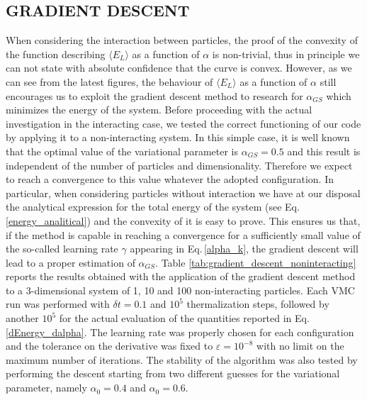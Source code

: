 \subsection{GRADIENT DESCENT}
\label{sec:gradient_descent_results}
When considering the interaction between particles, the proof of the convexity of the function describing $\langle E_L \rangle$ as a function of $\alpha$ is non-trivial, thus in principle we can not state with absolute confidence that the curve is convex. However, as we can see from the latest figures, the behaviour of $\langle E_L \rangle$ as a function of $\alpha$ still encourages us to exploit the gradient descent method to research for  $\alpha_{GS}$ which minimizes the energy of the system. Before proceeding with the actual investigation in the interacting case, we tested the correct functioning of our code by applying it to a non-interacting system. In this simple case, it is well known that the optimal value of the variational parameter is $\alpha_{GS}=0.5$ and this result is independent of the number of particles and dimensionality. Therefore we expect to reach a convergence to this value whatever the adopted configuration. In particular, when considering particles without interaction we have at our disposal the analytical expression for the total energy of the system (see Eq.\,\ref{energy_analitical}) and the convexity of it is easy to prove. This ensures us that, if the method is capable in reaching a convergence for a sufficiently small value of the so-called learning rate $\gamma$ appearing in Eq.\,\ref{alpha_k}, the gradient descent will lead to a proper estimation of $\alpha_{GS}$. Table \ref{tab:gradient_descent_noninteracting} reports the results obtained with the application of the gradient descent method to a 3-dimensional system of 1, 10 and 100 non-interacting particles. Each VMC run was performed with $\delta t=0.1$ and $10^5$ thermalization steps, followed by another $10^5$ for the actual evaluation of the quantities reported in Eq.\,\ref{dEnergy_dalpha}. The learning rate was properly chosen for each configuration and the tolerance on the derivative was fixed to $\varepsilon=10^{-8}$ with no limit on the maximum number of iterations. The stability of the algorithm was also tested by performing the descent starting from two different guesses for the variational parameter, namely $\alpha_0=0.4$ and $\alpha_0=0.6$.


